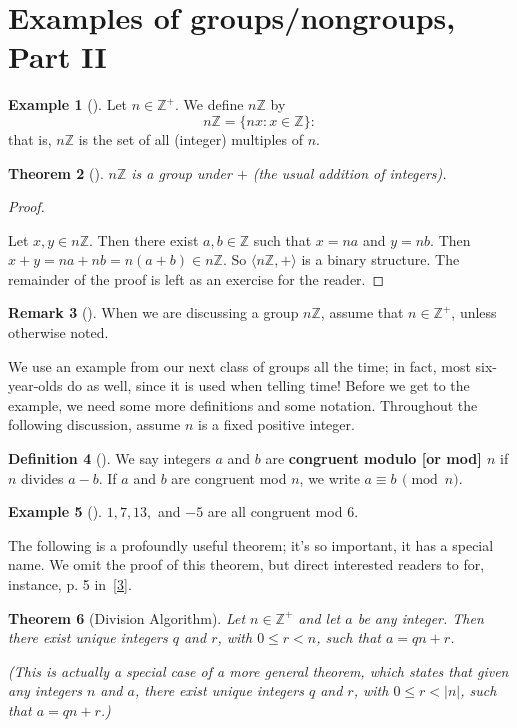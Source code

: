 \documentclass[10pt,]{book}
\newcommand{\terminology}[1]{\textbf{#1}}
\theoremstyle{plain}
\newtheorem{theorem}{Theorem}[section]
\theoremstyle{definition}
\newtheorem{definition}[theorem]{Definition}
\theoremstyle{definition}
\newtheorem{remark}[theorem]{Remark}
\theoremstyle{definition}
\newtheorem{example}[theorem]{Example}
\theoremstyle{definition}
\numberwithin{equation}{section}
\def\Z{\mathbb{Z}}
\newcommand{\lt}{<}
\begin{document}
\section[{Examples of groups/nongroups, Part II}]{Examples of groups/nongroups, Part II}\label{section-8}
\begin{example}[]\label{example-14}
Let \(n\in \Z^+\). We define \(n\Z\) by%
\begin{equation*}
n\Z=\{nx: x\in \Z\}:
\end{equation*}
that is, \(n\Z\) is the set of all (integer) multiples of \(n\).%
\end{example}
\begin{theorem}[{}]\label{nz}
\(n\Z\) is a group under \(+\) (the usual addition of integers).%
\end{theorem}
\begin{proof}\hypertarget{proof-13}{}
Let \(x, y\in n\Z\). Then there exist \(a,b\in \Z\) such that \(x=na\) and \(y=nb\). Then \(x+y=na+nb=n(a+b)\in n\Z\). So \(\langle n\Z,+\rangle\) is a binary structure. The remainder of the proof is left as an exercise for the reader.%
\end{proof}
\begin{remark}[]\label{remark-12}
When we are discussing a group \(n\Z\), assume that \(n\in \Z^+\), unless otherwise noted.%
\end{remark}
We use an example from our next class of groups all the time; in fact, most six-year-olds do as well, since it is used when telling time! Before we get to the example, we need some more definitions and some notation. Throughout the following discussion, assume \(n\) is a fixed positive integer.%
\begin{definition}[{}]\label{definition-24}
We say integers \(a\) and \(b\) are \terminology{congruent modulo [or mod] \(n\)} if \(n\) divides \(a-b\). If \(a\) and \(b\) are congruent mod \(n\), we write \(a \equiv b\, \pmod{n}\).%
\end{definition}
\begin{example}[]\label{cong_ex}
\(1, 7, 13,\) and \(-5\) are all congruent mod \(6\).%
\end{example}
The following is a profoundly useful theorem; it's so important, it has a special name. We omit the proof of this theorem, but direct interested readers to for, instance, p. 5 in~\hyperlink{NZM}{[3]}.%
\begin{theorem}[{Division Algorithm}]\label{divalg}
Let \(n\in \Z^+\) and let \(a\) be any integer. Then there exist unique integers \(q\) and \(r\), with \(0\leq
r \lt n\), such that \(a=qn+r\).%
\par
(This is actually a special case of a more general theorem, which states that given any integers \(n\) and \(a\), there exist unique integers \(q\) and \(r\), with \(0\leq
r\lt |n|\), such that \(a=qn+r\).)%
\end{theorem}
\end{document}
